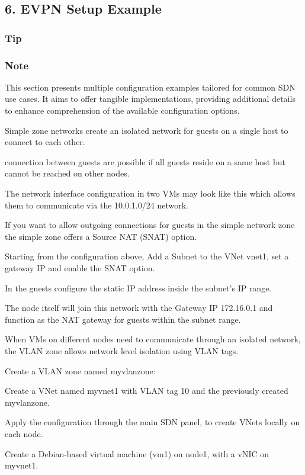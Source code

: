 \subsection{6. EVPN Setup Example}

\subsubsection{Tip}

\subsubsection{Note}

This section presents multiple configuration examples tailored for common SDN use cases. It aims to offer tangible implementations, providing additional details to enhance comprehension of the available configuration options.

Simple zone networks create an isolated network for guests on a single host to connect to each other.

connection between guests are possible if all guests reside on a same host but cannot be reached on other nodes.

The network interface configuration in two VMs may look like this which allows them to communicate via the 10.0.1.0/24 network.

If you want to allow outgoing connections for guests in the simple network zone the simple zone offers a Source NAT (SNAT) option.

Starting from the configuration above, Add a Subnet to the VNet vnet1, set a gateway IP and enable the SNAT option.

In the guests configure the static IP address inside the subnet’s IP range.

The node itself will join this network with the Gateway IP 172.16.0.1 and function as the NAT gateway for guests within the subnet range.

When VMs on different nodes need to communicate through an isolated network, the VLAN zone allows network level isolation using VLAN tags.

Create a VLAN zone named myvlanzone:

Create a VNet named myvnet1 with VLAN tag 10 and the previously created myvlanzone.

Apply the configuration through the main SDN panel, to create VNets locally on each node.

Create a Debian-based virtual machine (vm1) on node1, with a vNIC on myvnet1.

